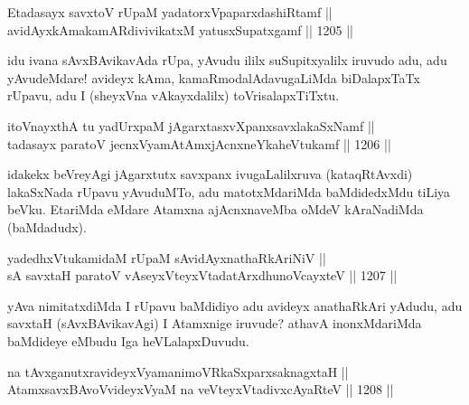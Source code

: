 
\begin{shl}
Etadasayx savxtoV rUpaM yadatorxVpaparxdashiRtamf || \\
avidAyxkAmakamARdivivikatxM yatusxSupatxgamf \hfill || 1205 ||  
\end{shl}

\begin{artha}
idu ivana sAvxBAvikavAda rUpa, yAvudu ililx suSupitxyalilx iruvudo adu, adu yAvudeMdare! avideyx kAma, kamaRmodalAdavugaLiMda biDalapxTaTx rUpavu, adu I (sheyxVna vAkayxdalilx) toVrisalapxTiTxtu.
\end{artha}

\begin{shl}
itoV\s nayxthA tu yadUrxpaM jAgarxtasxvXpanxsavxlakaSxNamf || \\
tadasayx paratoV jecnxVyamAtAmxjAcnxneYkaheVtukamf \hfill || 1206 ||  
\end{shl}

\begin{artha}
idakekx beVreyAgi jAgarxtutx savxpanx ivugaLalilxruva (kataqRtAvxdi) lakaSxNada rUpavu yAvuduMTo, adu matotxMdariMda baMdidedxMdu  tiLiya beVku. EtariMda eMdare Atamxna ajAcnxnaveMba oMdeV kAraNadiMda (baMdadudx).
\end{artha}


\begin{shl}
yadedhxVtukamidaM rUpaM sA\s vidAyx\s nathaRkAriNiV || \\
sA savxtaH paratoV vA\s seyxVteyxVtadatArxdhunoVcayxteV \hfill || 1207 ||  
\end{shl}

\begin{artha}
yAva nimitatxdiMda I rUpavu baMdidiyo adu avideyx anathaRkAri yAdudu, adu savxtaH (sAvxBAvikavAgi) I Atamxnige iruvude? athavA inonxMdariMda baMdideye eMbudu Iga heVLalapxDuvudu.
\end{artha}

\begin{shl}
na tAvxganutxravideyxVyamanimoVRkaSxparxsaknagxtaH || \\
AtamxsavxBAvoV\s videyxVyaM na veVteyxVtadivxcAyaRteV \hfill || 1208 ||  
\end{shl}

